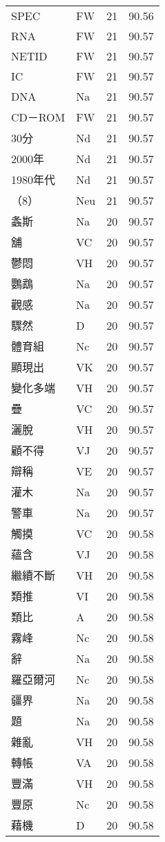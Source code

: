 \documentclass[twocolumn]{book}
\begin{document}
\begin{supertabular}{llrr}
SPEC & FW & 21 &  90.56\\
RNA & FW & 21 &  90.57\\
NETID & FW & 21 &  90.57\\
IC & FW & 21 &  90.57\\
DNA & Na & 21 &  90.57\\
CD－ROM & FW & 21 &  90.57\\
30分 & Nd & 21 &  90.57\\
2000年 & Nd & 21 &  90.57\\
1980年代 & Nd & 21 &  90.57\\
（8） & Neu & 21 &  90.57\\
螽斯 & Na & 20 &  90.57\\
舖 & VC & 20 &  90.57\\
鬱悶 & VH & 20 &  90.57\\
鸚鵡 & Na & 20 &  90.57\\
觀感 & Na & 20 &  90.57\\
驟然 & D & 20 &  90.57\\
體育組 & Nc & 20 &  90.57\\
顯現出 & VK & 20 &  90.57\\
變化多端 & VH & 20 &  90.57\\
疊 & VC & 20 &  90.57\\
灑脫 & VH & 20 &  90.57\\
顧不得 & VJ & 20 &  90.57\\
辯稱 & VE & 20 &  90.57\\
灌木 & Na & 20 &  90.57\\
警車 & Na & 20 &  90.57\\
觸摸 & VC & 20 &  90.58\\
蘊含 & VJ & 20 &  90.58\\
繼續不斷 & VH & 20 &  90.58\\
類推 & VI & 20 &  90.58\\
類比 & A & 20 &  90.58\\
霧峰 & Nc & 20 &  90.58\\
辭 & Na & 20 &  90.58\\
羅亞爾河 & Nc & 20 &  90.58\\
疆界 & Na & 20 &  90.58\\
題 & Na & 20 &  90.58\\
雜亂 & VH & 20 &  90.58\\
轉帳 & VA & 20 &  90.58\\
豐滿 & VH & 20 &  90.58\\
豐原 & Nc & 20 &  90.58\\
藉機 & D & 20 &  90.58\\

\end{supertabular}
\end{document}

